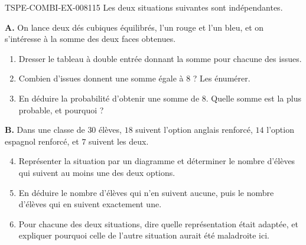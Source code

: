 \begin{exercice}{TSPE-COMBI-EX-008}{1}{15}
Les deux situations suivantes sont indépendantes.

\medskip
\textbf{A.} On lance deux dés cubiques équilibrés, l'un rouge et l'un bleu, et on
s'intéresse à la somme des deux faces obtenues.
\begin{enumerate}
  \item Dresser le tableau à double entrée donnant la somme pour chacune des
    issues.
  \item Combien d'issues donnent une somme égale à $8$ ? Les énumérer.
  \item En déduire la probabilité d'obtenir une somme de $8$. Quelle somme est la
    plus probable, et pourquoi ?
\end{enumerate}

\medskip
\textbf{B.} Dans une classe de $30$ élèves, $18$ suivent l'option anglais
renforcé, $14$ l'option espagnol renforcé, et $7$ suivent les deux.
\begin{enumerate}
  \setcounter{enumi}{3}
  \item Représenter la situation par un diagramme et déterminer le nombre
    d'élèves qui suivent au moins une des deux options.
  \item En déduire le nombre d'élèves qui n'en suivent aucune, puis le nombre
    d'élèves qui en suivent exactement une.
  \item Pour chacune des deux situations, dire quelle représentation était
    adaptée, et expliquer pourquoi celle de l'autre situation aurait été
    maladroite ici.
\end{enumerate}
\end{exercice}
